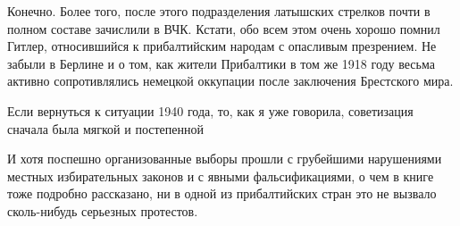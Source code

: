 
Конечно. Более того, после этого подразделения латышских стрелков почти в
полном составе зачислили в ВЧК. Кстати, обо всем этом очень хорошо помнил
Гитлер, относившийся к прибалтийским народам с опасливым презрением. Не забыли
в Берлине и о том, как жители Прибалтики в том же 1918 году весьма активно
сопротивлялись немецкой оккупации после заключения Брестского мира.

\begin{leftbar}
\large
Если вернуться к ситуации 1940 года, то, как я уже говорила, советизация
сначала была мягкой и постепенной
\end{leftbar}

И хотя поспешно организованные выборы прошли с грубейшими нарушениями местных
избирательных законов и с явными фальсификациями, о чем в книге тоже подробно
рассказано, ни в одной из прибалтийских стран это не вызвало сколь-нибудь
серьезных протестов.

